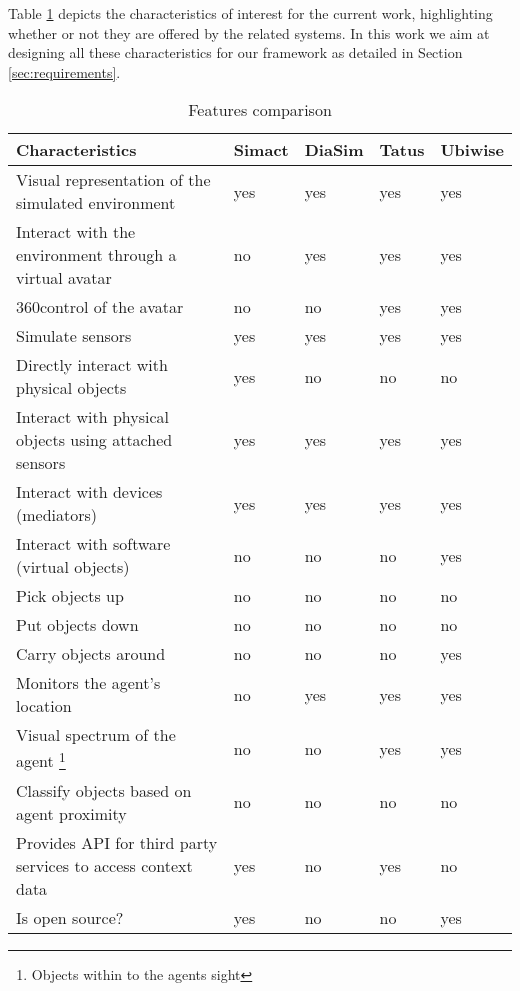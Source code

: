 Table \ref{table:comparison} depicts the characteristics of interest for the current work, highlighting whether or not they are offered by the related systems. In this work we aim at designing all these characteristics for our framework as detailed in Section \ref{sec:requirements}.

\begin{table}[H]
	\begin{center}
		\small \begin{tabular*}{1.1\columnwidth}{p{6.5cm}llll}
			\\ \hline \hline
			Characteristics & Simact & DiaSim & Tatus & Ubiwise \\ \hline \hline

			Visual representation of the simulated environment & yes & yes & yes & yes \\ \hline
			Interact with the environment through a virtual avatar & no & yes & yes & yes \\ \hline
			360\textdegree control of the avatar & no & no & yes & yes \\ \hline
			Simulate sensors & yes & yes & yes & yes \\ \hline
			Directly interact with physical objects & yes & no & no & no \\ \hline
			Interact with physical objects using attached sensors & yes & yes & yes & yes \\ \hline
			Interact with devices (mediators) & yes & yes & yes & yes \\ \hline
			Interact with software (virtual objects) & no & no & no & yes \\ \hline
			Pick objects up & no & no & no & no \\ \hline
			Put objects down & no & no & no & no \\ \hline
			Carry objects around & no & no & no & yes \\ \hline
			Monitors the agent's location & no & yes & yes & yes \\ \hline
			Visual spectrum of the agent \footnote{Objects within to the agents sight} & no & no & yes & yes \\ \hline
			Classify objects based on agent proximity & no & no & no & no \\ \hline
		 	Provides API for third party services to access context data & yes & no & yes & no \\ \hline
		 	Is open source? & yes & no & no & yes \\ \hline
		\end{tabular*}
		
		\caption{Features comparison}
		\label{table:comparison}
	\end{center}
\end{table}

